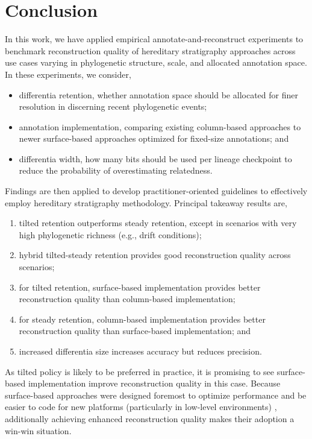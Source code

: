 \section{Conclusion} \label{sec:conclusion}

In this work, we have applied empirical annotate-and-reconstruct experiments to benchmark reconstruction quality of hereditary stratigraphy approaches across use cases varying in phylogenetic structure, scale, and allocated annotation space.
In these experiments, we consider,
\begin{itemize}
\item differentia retention, whether annotation space should be allocated for finer resolution in discerning recent phylogenetic events;
\item annotation implementation, comparing existing column-based approaches to newer surface-based approaches optimized for fixed-size annotations; and
\item differentia width, how many bits should be used per lineage checkpoint to reduce the probability of overestimating relatedness.
\end{itemize}

Findings are then applied to develop practitioner-oriented guidelines to effectively employ hereditary stratigraphy methodology.
Principal takeaway results are,
\begin{enumerate}
\item tilted retention outperforms steady retention, except in scenarios with very high phylogenetic richness (e.g., drift conditions);
\item hybrid tilted-steady retention provides good reconstruction quality across scenarios;
\item for tilted retention, surface-based implementation provides better reconstruction quality than column-based implementation;
\item for steady retention, column-based implementation provides better reconstruction quality than surface-based implementation; and
\item increased differentia size increases accuracy but reduces precision.
\end{enumerate}
As tilted policy is likely to be preferred in practice, it is promising to see surface-based implementation improve reconstruction quality in this case.
Because surface-based approaches were designed foremost to optimize performance and be easier to code for new platforms (particularly in low-level environments) \citep{moreno2024trackable}, additionally achieving enhanced reconstruction quality makes their adoption a win-win situation.

